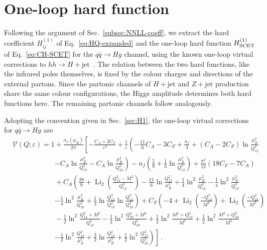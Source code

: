 \chapter{One-loop hard function}
\label{ap:H1-extraction}

Following the argument of Sec.~\ref{subsec:NNLL-coeff}, we extract the
hard coefficient $H^{(1)}_{ij}$ of Eq.~\eqref{eq:HQ-expanded} and the
one-loop hard function $H^{(1)}_{\rm SCET}$ of Eq.~\eqref{eq:CH-SCET}
for the $q\bar q\to Hg$ channel, using the known one-loop virtual
corrections to $hh\to H+\mathrm{jet}$~\cite{Ravindran:2002dc}. The relation
between the two hard functions, like the infrared poles themselves, is fixed
by the colour charges and directions of the external partons. 
Since the partonic channels of $H+\mathrm{jet}$ and $Z+\mathrm{jet}$ production
share the same colour configurations, the Higgs amplitude determines both hard
functions here. The remaining partonic channels follow analogously.

Adopting the convention given in Sec.~\ref{sec:H1},
the one-loop virtual corrections for $q\bar q\to Hg$ are
\begin{equation}
\label{eq:V-oneloop}
\begin{aligned}
&\mathcal{V}(Q;\varepsilon)=1+\frac{\alpha_s(\mu_R)}{2\pi}\left[
-\frac{C_A+2C_F}{\varepsilon^2}+\frac{1}{\varepsilon}\left(-\frac{11}{6}C_A-3C_F
+\frac{n_f}{3}+(C_A-2C_F)\ln\frac{\mu_R^2}{Q_{12}^2}\right.\right. \\[0.5ex]
&\qquad\qquad\qquad \left. 
-C_A\ln\frac{\mu_R^2}{Q_{13}^2}-C_A\ln\frac{\mu_R^2}{Q_{23}^2}\right)
-n_f\left(\frac{5}{9}+\frac{1}{3}\ln\frac{\mu_R^2}{Q_{12}^2}\right)+\frac{\pi^2}{12}\left(
18C_F-7C_A\right)\\
& \qquad\qquad\qquad+C_A\left(
\frac{38}{9}+\operatorname{Li}_2\left(\frac{Q_{12}^2-M^2}{Q_{12}^2}\right)
-\frac{11}{6}\ln\frac{Q_{12}^2}{\mu_R^2}+\frac{1}{4}\ln^2\frac{\mu_R^2}{Q_{12}^2}
-\frac{1}{4}\ln^2\frac{\mu_R^2}{Q_{13}^2}\right.\\[0.5ex]
&\qquad\qquad\qquad\left.-\frac{1}{4}\ln^2\frac{\mu_R^2}{Q_{23}^2}
+\frac{1}{2}\ln\frac{Q_{12}^2}{Q_{13}^2} \ln\frac{Q_{12}^2}{Q_{23}^2}\right)
+C_F\left(-4+\operatorname{Li}_2\left(\frac{-Q_{13}^2}{M^2}\right)
+\operatorname{Li}_2\left(\frac{-Q_{23}^2}{M^2}\right) \right.\\[0.5ex]
&\qquad\qquad\qquad-\frac{1}{2}\ln^2\frac{Q_{13}^2+M^2}{Q_{13}^2}
-\frac{1}{2}\ln^2\frac{Q_{23}^2+M^2}{Q_{23}^2}
+\frac{1}{2}\ln^2\frac{M^2+Q_{13}^2}{M^2}
+\frac{1}{2}\ln^2\frac{M^2+Q_{23}^2}{M^2}\\[0.5ex]
&\qquad\qquad\qquad\left.\left.
-\frac{1}{2}\ln^2\frac{Q_{12}^2}{\mu_R^2}
+\frac{3}{2}\ln\frac{Q_{12}^2}{\mu_R^2}
+\frac{1}{2}\ln^2\frac{Q_{13}^2}{Q_{23}^2}
\right)\right]\,.
\end{aligned}
\end{equation}

